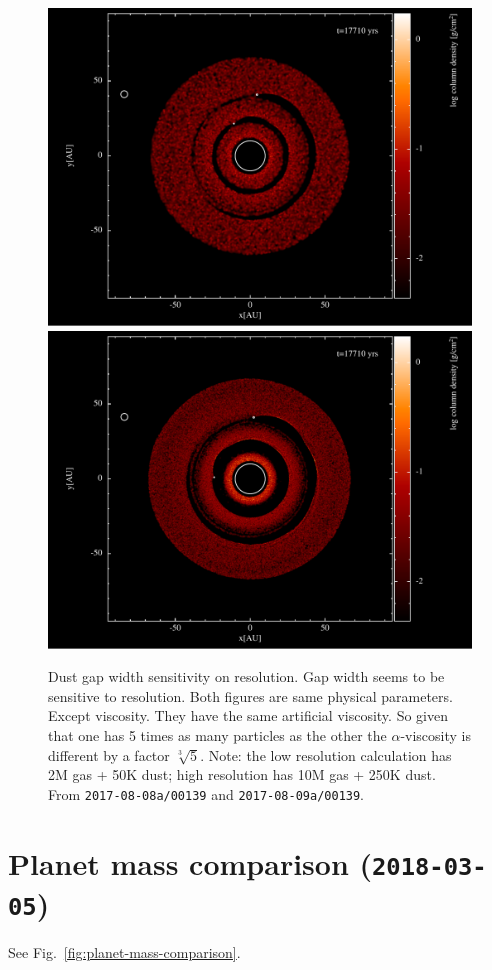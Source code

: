 \documentclass[usenatbib,a4paper,times,fleqn]{mnras}
\begin{document}
\begin{figure}
   \begin{center}
      \includegraphics[width=0.48\columnwidth]{figs/dust_gap_low_resolution.pdf}
      \includegraphics[width=0.48\columnwidth]{figs/dust_gap_high_resolution.pdf}
      \caption{Dust gap width sensitivity on resolution. Gap width seems to be
         sensitive to resolution. Both figures are same physical parameters.
         Except viscosity. They have the same artificial viscosity. So given
         that one has 5 times as many particles as the other the
         $\alpha$-viscosity is different by a factor $\sqrt[3]{5}$.
         Note: the low resolution calculation has 2M gas + 50K dust; high
         resolution has 10M gas + 250K dust. From \texttt{2017-08-08a/00139}
         and \texttt{2017-08-09a/00139}.}
      \label{fig:gap-width-resolution}
   \end{center}
\end{figure}



\section*{Planet mass comparison (\texttt{2018-03-05})}

See Fig.~\ref{fig:planet-mass-comparison}.
\end{document}
